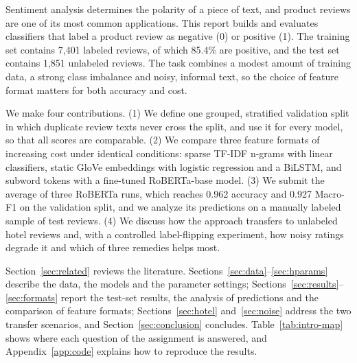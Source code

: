 Sentiment analysis determines the polarity of a piece of text, and product reviews are one of its most common applications.
This report builds and evaluates classifiers that label a product review as negative (0) or positive (1).
The training set contains 7{,}401 labeled reviews, of which 85.4\% are positive, and the test set contains 1{,}851 unlabeled reviews.
The task combines a modest amount of training data, a strong class imbalance and noisy, informal text, so the choice of feature format matters for both accuracy and cost.

We make four contributions.
(1) We define one grouped, stratified validation split in which duplicate review texts never cross the split, and use it for every model, so that all scores are comparable.
(2) We compare three feature formats of increasing cost under identical conditions: sparse TF-IDF n-grams with linear classifiers, static GloVe embeddings with logistic regression and a BiLSTM, and subword tokens with a fine-tuned RoBERTa-base model.
(3) We submit the average of three RoBERTa runs, which reaches 0.962 accuracy and 0.927 Macro-F1 on the validation split, and we analyze its predictions on a manually labeled sample of test reviews.
(4) We discuss how the approach transfers to unlabeled hotel reviews and, with a controlled label-flipping experiment, how noisy ratings degrade it and which of three remedies helps most.

Section~\ref{sec:related} reviews the literature. Sections~\ref{sec:data}--\ref{sec:hparams} describe the data, the models and the parameter settings; Sections~\ref{sec:results}--\ref{sec:formats} report the test-set results, the analysis of predictions and the comparison of feature formats; Sections~\ref{sec:hotel} and~\ref{sec:noise} address the two transfer scenarios, and Section~\ref{sec:conclusion} concludes.
Table~\ref{tab:intro-map} shows where each question of the assignment is answered, and Appendix~\ref{app:code} explains how to reproduce the results.

